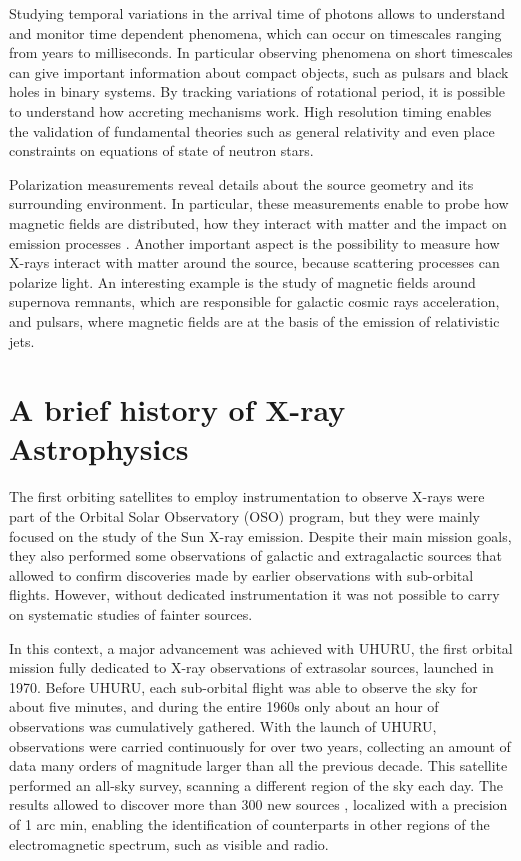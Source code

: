 Studying temporal variations in the arrival time of photons allows to understand and monitor time dependent phenomena, which can occur on timescales ranging from years to milliseconds. In particular observing phenomena on short timescales can give important information about compact objects, such as pulsars and black holes in binary systems. By tracking variations of rotational period, it is possible to understand how accreting mechanisms work. High resolution timing enables the validation of fundamental theories such as general relativity and even place constraints on equations of state of neutron stars. 

Polarization measurements reveal details about the source geometry and its surrounding environment. In particular, these measurements enable to probe how magnetic fields are distributed, how they interact with matter and the impact on emission processes \cite{xray_polarimetry}. Another important aspect is the possibility to measure how X-rays interact with matter around the source, because scattering processes can polarize light. An interesting example is the study of magnetic fields around supernova remnants, which are responsible for galactic cosmic rays acceleration, and pulsars, where magnetic fields are at the basis of the emission of relativistic jets.


\section{A brief history of X-ray Astrophysics}
\label{section:history}

The first orbiting satellites to employ instrumentation to observe X-rays were part of the Orbital Solar Observatory (OSO) program, but they were mainly focused on the study of the Sun X-ray emission. Despite their main mission goals, they also performed some observations of galactic and extragalactic sources that allowed to confirm discoveries made by earlier observations with sub-orbital flights. However, without dedicated instrumentation it was not possible to carry on systematic studies of fainter sources. 

In this context, a major advancement was achieved with UHURU, the first orbital mission fully dedicated to X-ray observations of extrasolar sources, launched in 1970. Before UHURU, each sub-orbital flight was able to observe the sky for about five minutes, and during the entire 1960s only about an hour of observations was cumulatively gathered. With the launch of UHURU, observations were carried continuously for over two years, collecting an amount of data many orders of magnitude larger than all the previous decade. This satellite performed an all-sky survey, scanning a different region of the sky each day. The results allowed to discover more than 300 new sources \cite{4ucatalog}, localized with a precision of 1 arc min, enabling the identification of counterparts in other regions of the electromagnetic spectrum, such as visible and radio.

